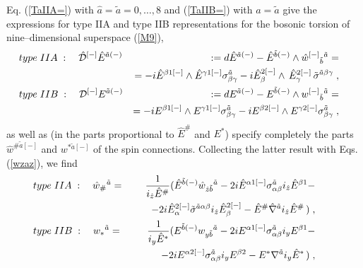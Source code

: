 \documentclass[a4paper,11pt]{article}
\begin{document}
Eq. (\ref{TaIIA=}) with $ \hat{a}= \tilde{a}=0,\ldots , 8$ 
and (\ref{TaIIB=}) with  $ {a}= \tilde{a}$ give 
the expressions for type IIA and type IIB representations 
for the bosonic torsion of nine--dimensional superspace (\ref{M9}), 
\begin{eqnarray} 
\label{Ta9IIA} 
& type\;  IIA \; : \quad 
\hat{{\cal D}}^{[-]} \hat{E}^{\tilde{a}(-)} & := 
d\hat{E}^{\tilde{a}(-)} - \hat{E}^{\tilde{b}(-)}\wedge 
\hat{w}^{[-]}{}_{\tilde{b}}{}^{\tilde{a}} = \quad 
\nonumber \\ &&  =
 - i \hat{E}^{{\beta}1[-]}\wedge 
\hat{E}^{ {\gamma}1[-]} 
\sigma^{ \tilde{a}}_{ {\beta} {\gamma}} - i
\hat{E}_{{\beta}}^{2[-]} \wedge \, \hat{E}_{ {\gamma}}^{2[-]} \,   
\tilde{\sigma}^{\tilde{a} {\beta} {\gamma}}
 \; ,  \quad 
\\ 
\label{Ta9IIB} 
& type\;  IIB \; : \quad 
{\cal D}^{[-]} {E}^{\tilde{a}(-)} & := 
d{E}^{\tilde{a}(-)} - {E}^{\tilde{b}(-)}\wedge 
{w}^{[-]}{}_{\tilde{b}}{}^{\tilde{a}} = \quad 
\nonumber \\ &&  =
- i E^{ {\beta}1[-]} \wedge E^{ {\gamma}1[-]} 
\sigma^{  \tilde{a}}_{ {\beta} {\gamma}} - i 
E^{ {\beta}2[-]} \wedge E^{ {\gamma}2[-]}
\sigma^{ \tilde{a}}_{ {\beta} {\gamma}} 
 \; , \quad 
\end{eqnarray}
as well as (in the parts proportional to $\hat{E}^{\#}$ and $E^*$) 
specify completely the parts $\hat{w}^{\# \tilde{a}[-]}$ and 
${w}^{* \tilde{a}[-]}$ of the spin connections. Collecting the latter 
result with Eqs. (\ref{wzaz}), we find 
\begin{eqnarray} 
\label{wza} 
& type\;  IIA \; : \quad \hat{w}_{\#}{}^{\tilde{a}} =& 
{1\over i_{\hat{z}}\hat{E}^{\#}} (\hat{E}^{\tilde{b}(-)} 
\hat{w}_{\hat{z}\tilde{b}}{}^{\tilde{a}} 
- 2i \hat{E}^{{\alpha}1[-]}  \sigma^{\tilde{a}}_{ \alpha {\beta}} 
i_{\hat{z}}\hat{E}^{{\beta}1} - \qquad \nonumber \\ && \qquad 
- 2i \hat{E}_{{\alpha}}^{2[-]}
\tilde{\sigma}^{\tilde{a} \alpha {\beta}}
i_{\hat{z}}\hat{E}_{{\beta}}^{2[-]} - 
\hat{E}^{\#}
\hat{\nabla}^{\tilde{a}}i_{\hat{z}}\hat{E}^{\#}\, )\; ,\qquad 
\\ \label{wya} 
& type\;  IIB \; : \quad {w}_{*}{}^{\tilde{a}} =& 
{1\over i_{y}\hat{E}^{*}} ({E}^{\tilde{b}(-)} 
{w}_{y\tilde{b}}{}^{\tilde{a}} 
- 2i {E}^{{\alpha}1[-]}  \sigma^{\tilde{a}}_{ \alpha {\beta}} 
i_{y}{E}^{{\beta}1} - \qquad \nonumber \\ && \qquad 
- 2i {E}^{{\alpha}2[-]}  \sigma^{\tilde{a}}_{ \alpha {\beta}} 
i_{y}{E}^{{\beta}2} - 
{E}^{*}
{\nabla}^{\tilde{a}}i_{y}\hat{E}^{*} \, )\; ,\qquad 
\end{eqnarray}
\end{document}
